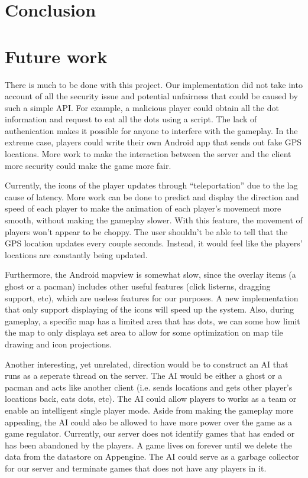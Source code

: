 \documentclass{acm_proc_article-sp}
\begin{document}
\section{Conclusion}

\section{Future work}
\label{future}

There is much to be done with this project. Our implementation did not
take into account of all the security issue and potential unfairness
that could be caused by such a simple API. For example, a malicious
player could obtain all the dot information and request to eat all the
dots using a script. The lack of authenication makes it possible for
anyone to interfere with the gameplay. In the extreme case, players
could write their own Android app that sends out fake GPS
locations. More work to make the interaction between the server and
the client more security could make the game more fair.

Currently, the icons of the player updates through ``teleportation''
due to the lag cause of latency. More work can be done to predict and
display the direction and speed of each player to make the animation
of each player's movement more smooth, without making the gameplay
slower. With this feature, the movement of players won't appear to be
choppy. The user shouldn't be able to tell that the GPS location
updates every couple seconds. Instead, it would feel like the players'
locations are constantly being updated.

Furthermore, the Android mapview is somewhat slow, since the overlay
items (a ghost or a pacman) includes other useful features (click
listerns, dragging support, etc), which are useless features for our
purposes. A new implementation that only support displaying of the
icons will speed up the system. Also, during gameplay, a specific map
has a limited area that has dots, we can some how limit the map to
only displaya set area to allow for some optimization on map tile
drawing and icon projections.

Another interesting, yet unrelated, direction would be to construct an
AI that runs as a seperate thread on the server. The AI would be
either a ghost or a pacman and acts like another client (i.e. sends
locations and gets other player's locations back, eats dots, etc). The
AI could allow players to works as a team or enable an intelligent
single player mode. Aside from making the gameplay more appealing, the
AI could also be allowed to have more power over the game as a game
regulator. Currently, our server does not identify games that has
ended or has been abandoned by the players. A game lives on forever
until we delete the data from the datastore on Appengine. The AI could
serve as a garbage collector for our server and terminate games that
does not have any players in it.
\end{document}
